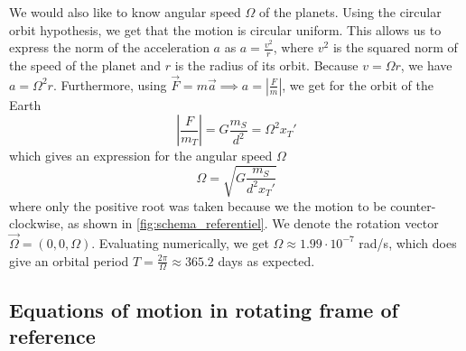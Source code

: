 We would also like to know angular speed \(\Omega\) of the planets. Using the circular orbit hypothesis, we get that the motion is circular uniform. This allows us to express the norm of the acceleration \(a\) as \(a = \frac{v^2}{r}\), where \(v^2\) is the squared norm of the speed of the planet and \(r\) is the radius of its orbit. Because \(v = \Omega r\), we have \(a = \Omega^2 r\). Furthermore, using \(\vec F=m \vec a \implies a = \left|\frac{F}{m}\right|\), we get for the orbit of the Earth
\begin{equation}
    \left|\frac{F}{m_T}\right| = G \frac{m_S}{d^2} = \Omega^2 x_T'
\end{equation}
which gives an expression for the angular speed \(\Omega\)
\begin{equation}
    \Omega = \sqrt{G \frac{m_S}{d^2 x_T'}}
\end{equation}
where only the positive root was taken because we the motion to be counter-clockwise, as shown in \autoref{fig:schema_referentiel}. We denote the rotation vector \(\vec\Omega = (0, 0, \Omega)\). Evaluating numerically, we get \(\Omega \approx 1.99 \cdot 10^{-7}\) rad/s, which does give an orbital period \(T = \frac{2 \pi}{\Omega} \approx 365.2\) days as expected.

\subsection{Equations of motion in rotating frame of reference}
\label{sec:3body_reduced}

